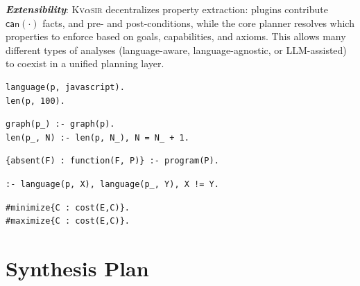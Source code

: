 \documentclass[nonacm,sigplan]{acmart}
\newcommand{\sys}{{\scshape Kv{$\alpha$}sir}\xspace}
\newcommand{\heading}[1]{\vspace{2pt}\noindent\textbf{\emph{#1}}:\enspace}
\newcommand{\ttt}[1]{\texttt{#1}\xspace}
\begin{document}
\heading{Extensibility}
\sys decentralizes property extraction: plugins contribute $\mathsf{can}(\cdot)$ facts, and pre- and post-conditions, while the core planner resolves which properties to enforce based on goals, capabilities, and axioms.
This allows many different types of analyses (language-aware, language-agnostic, or LLM-assisted)
to coexist in a unified planning layer.

\begin{listing}
\begin{verbatim}
language(p, javascript).
len(p, 100).
\end{verbatim}
\caption{A set of facts over a program.}
\label{lst:terms}
\end{listing}

\begin{listing}
\begin{verbatim}
graph(p_) :- graph(p).
len(p_, N) :- len(p, N_), N = N_ + 1.
\end{verbatim}
\caption{Logic rules describing relationships between the original and regenerated program.}
\label{lst:rules}
\end{listing}

\begin{listing}
\begin{verbatim}
{absent(F) : function(F, P)} :- program(P).
\end{verbatim}
\caption{A choice rule.}
\label{lst:choice}
\end{listing}

\begin{listing}
\begin{verbatim}
:- language(p, X), language(p_, Y), X != Y.
\end{verbatim}
\caption{An integrity constraint.}
\label{lst:constraint}
\end{listing}

\begin{listing}
\begin{verbatim}
#minimize{C : cost(E,C)}.
#maximize{C : cost(E,C)}.
\end{verbatim}
\caption{Examples of optimization directives. Note that this differs from \sys's \ttt{\#min} or \ttt{\#max} directives, which is used to direct the synthesizer to minimize a program's property but has no effect on the produced answer set.}
\label{lst:optimization}
\end{listing}


\section{Synthesis Plan}
\label{sec:synthesis}
\end{document}
